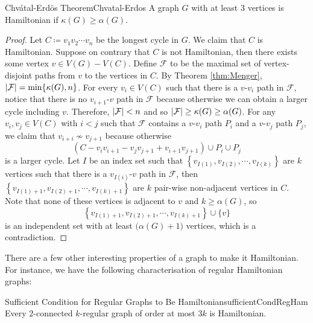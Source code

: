 \documentclass[math, code]{amznotes}
\theoremstyle{remark}
\begin{document}
\begin{thmbox}{Chv\'{a}tal-Erd\"{o}s Theorem}{Chvatal-Erdos}
    A graph $G$ with at least $3$ vertices is Hamiltonian if $\kappa(G) \geq \alpha(G)$.
    \tcblower
    \begin{proof}
        Let $C \coloneqq v_1v_2\cdots v_n$ be the longest cycle in $G$. We claim that $C$ is Hamiltonian. Suppose on contrary that $C$ is not Hamiltonian, then there exists some vertex $v \in V(G) - V(C)$. Define $\mathcal{F}$ to be the maximal set of vertex-disjoint paths from $v$ to the vertices in $C$. By Theorem \ref{thm:Menger}, ${\left\lvert {\mathcal{F}} \right\rvert} = \min\{\kappa(G), n\}$. For every $v_i \in V(C)$ such that there is a $v$-$v_i$ path in $\mathcal{F}$, notice that there is no $v_{i + 1}$-$v$ path in $\mathcal{F}$ because otherwise we can obtain a larger cycle including $v$. Therefore, ${\left\lvert {\mathcal{F}} \right\rvert} < n$ and so ${\left\lvert {\mathcal{F}} \right\rvert} \geq \kappa(G) \geq \alpha(G)$. For any $v_i, v_j \in V(C)$ with $i < j$ such that $\mathcal{F}$ contains a $v$-$v_i$ path $P_i$ and a $v$-$v_j$ path $P_j$, we claim that $v_{i + i} \not\sim v_{j + 1}$ because otherwise 
        \begin{equation*}
            \left(C - v_iv_{i + 1} - v_jv_{j + 1} + v_{i + 1}v_{j + 1}\right) \cup P_i \cup P_j
        \end{equation*}
        is a larger cycle. Let $I$ be an index set such that $\left\{v_{I(1)}, v_{I(2)}, \cdots, v_{I(k)}\right\}$ are $k$ vertices such that there is a $v_{I(i)}$-$v$ path in $\mathcal{F}$, then $\left\{v_{I(1) + 1}, v_{I(2) + 1}, \cdots, v_{I(k) + 1}\right\}$ are $k$ pair-wise non-adjacent vertices in $C$. Note that none of these vertices is adjacent to $v$ and $k \geq \alpha(G)$, so 
        \begin{equation*}
            \left\{v_{I(1) + 1}, v_{I(2) + 1}, \cdots, v_{I(k) + 1}\right\} \cup \{v\}
        \end{equation*}
        is an independent set with at least $\bigl(\alpha(G) + 1\bigr)$ vertices, which is a contradiction.
    \end{proof}
\end{thmbox}
There are a few other interesting properties of a graph to make it Hamiltonian. For instance, we have the following characterisation of regular Hamiltonian graphs:
\begin{probox}{Sufficient Condition for Regular Graphs to Be Hamiltonian}{sufficientCondRegHam}
    Every $2$-connected $k$-regular graph of order at most $3k$ is Hamiltonian.
\end{probox}
\end{document}
